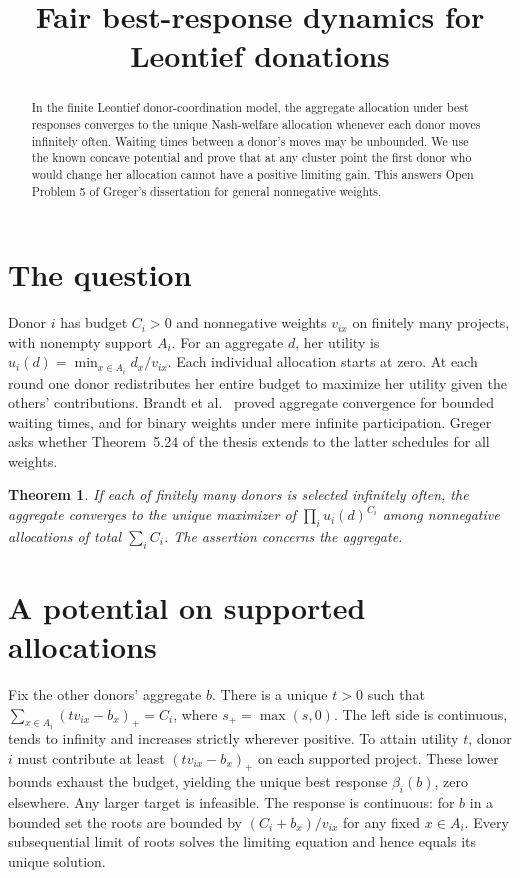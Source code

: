 \documentclass[11pt,a4paper]{amsart}
\title{Fair best-response dynamics for Leontief donations}
\date{}
\newtheorem{theorem}{Theorem}
\begin{document}
\begin{abstract}
In the finite Leontief donor-coordination model, the aggregate allocation under best responses converges to the unique Nash-welfare allocation whenever each donor moves infinitely often. Waiting times between a donor's moves may be unbounded. We use the known concave potential and prove that at any cluster point the first donor who would change her allocation cannot have a positive limiting gain. This answers Open Problem 5 of Greger's dissertation for general nonnegative weights.
\end{abstract}
\maketitle
\section{The question}
Donor $i$ has budget $C_i>0$ and nonnegative weights $v_{ix}$ on finitely many projects, with nonempty support $A_i$. For an aggregate $d$, her utility is $u_i(d)=\min_{x\in A_i}d_x/v_{ix}$. Each individual allocation starts at zero. At each round one donor redistributes her entire budget to maximize her utility given the others' contributions. Brandt et al.~\cite[Section 6.1]{brandt} proved aggregate convergence for bounded waiting times, and for binary weights under mere infinite participation. Greger~\cite[Open Problem 5, p.~99]{greger} asks whether Theorem~5.24 of the thesis extends to the latter schedules for all weights.

\begin{theorem}
If each of finitely many donors is selected infinitely often, the aggregate converges to the unique maximizer of $\prod_i u_i(d)^{C_i}$ among nonnegative allocations of total $\sum_i C_i$. The assertion concerns the aggregate.
\end{theorem}

\section{A potential on supported allocations}
Fix the other donors' aggregate $b$. There is a unique $t>0$ such that $\sum_{x\in A_i}(tv_{ix}-b_x)_+=C_i$, where $s_+=\max(s,0)$. The left side is continuous, tends to infinity and increases strictly wherever positive. To attain utility $t$, donor $i$ must contribute at least $(tv_{ix}-b_x)_+$ on each supported project. These lower bounds exhaust the budget, yielding the unique best response $\beta_i(b)$, zero elsewhere. Any larger target is infeasible. The response is continuous: for $b$ in a bounded set the roots are bounded by $(C_i+b_x)/v_{ix}$ for any fixed $x\in A_i$. Every subsequential limit of roots solves the limiting equation and hence equals its unique solution.
\end{document}

